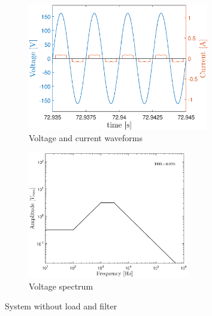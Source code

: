 \begin{doublespacing}
	
	
	
	\begin{figure}[!htb] %
		\centering
		\begin{subfigure}[b]{0.5\textwidth}
			\centering
			\includegraphics[height=5.5cm]{Figures/artigo_unfilt_1.eps}
			\caption{Voltage and current waveforms} 
			\label{fig:artigo_unfilt_1.eps}
		\end{subfigure}%
		\hfill
		\begin{subfigure}[b]{0.5\textwidth}  
			\centering 
			\includegraphics[height=5.5cm]{Figures/artigo_unfilt_2.eps}
			\caption{Voltage spectrum}    
			\label{fig:artigo_unfilt_2.eps}
		\end{subfigure}%
		\caption{System without load and filter}
		\label{fig:1}
	\end{figure}
	

\end{doublespacing}
